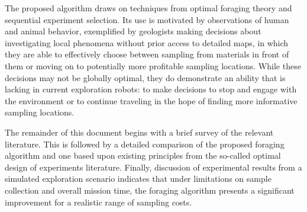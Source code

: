 The proposed algorithm draws on techniques from optimal foraging theory and sequential experiment selection.  Its use is motivated by observations of human and animal behavior, exemplified by geologists making decisions about investigating local phenomena without prior access to detailed maps, in which they are able to effectively choose between sampling from materials in front of them or moving on to potentially more profitable sampling locations.  While these decisions may not be globally optimal, they do demonstrate an ability that is lacking in current exploration robots: to make decisions to stop and engage with the environment or to continue traveling in the hope of finding more informative sampling locations.

The remainder of this document begins with a brief survey of the relevant literature.  This is followed by a detailed comparison of the proposed foraging algorithm and one based upon existing principles from the so-called optimal design of experiments literature.  Finally, discussion of experimental results from a simulated exploration scenario indicates that under limitations on sample collection and overall mission time, the foraging algorithm presents a significant improvement for a realistic range of sampling costs.


	
	


